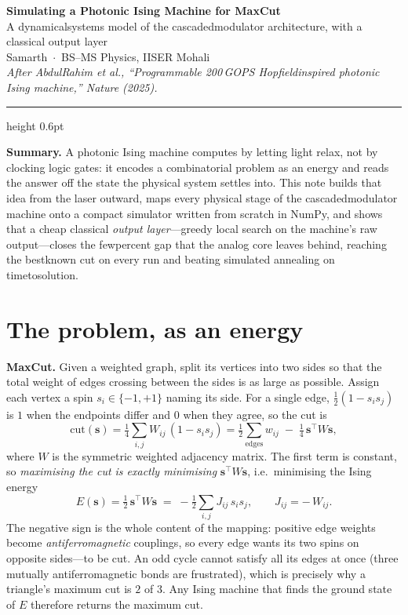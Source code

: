 \documentclass[11pt]{article}
\newcommand{\bs}{\mathbf{s}}
\begin{document}
\begin{center}
{\LARGE\bfseries\color{ink} Simulating a Photonic Ising Machine for Max\text{-}Cut}\\[0.35em]
{\large\color{accent} A dynamical\text{-}systems model of the cascaded\text{-}modulator architecture, with a classical output layer}\\[0.8em]
{\normalsize Samarth \,\textbf{$\cdot$}\, BS--MS Physics, IISER Mohali}\\[0.2em]
{\small\itshape After Abdul\text{-}Rahim \textit{et al.}, ``Programmable 200\,GOPS Hopfield\text{-}inspired photonic Ising machine,'' \textit{Nature} (2025).}
\end{center}

\vspace{0.4em}
\hrule height 0.6pt
\vspace{0.9em}

\noindent\textbf{Summary.}\; A photonic Ising machine computes by letting light relax, not by clocking logic gates: it encodes a combinatorial problem as an energy and reads the answer off the state the physical system settles into. This note builds that idea from the laser outward, maps every physical stage of the cascaded\text{-}modulator machine onto a compact simulator written from scratch in NumPy, and shows that a cheap classical \emph{output layer}---greedy local search on the machine's raw output---closes the few\text{-}percent gap that the analog core leaves behind, reaching the best\text{-}known cut on every run and beating simulated annealing on time\text{-}to\text{-}solution.

\section{The problem, as an energy}

\textbf{Max\text{-}Cut.} Given a weighted graph, split its vertices into two sides so that the total weight of edges crossing between the sides is as large as possible. Assign each vertex a spin $s_i\in\{-1,+1\}$ naming its side. For a single edge, $\tfrac{1}{2}(1-s_is_j)$ is $1$ when the endpoints differ and $0$ when they agree, so the cut is
\begin{equation}
\mathrm{cut}(\bs)=\tfrac14\sum_{i,j} W_{ij}\,(1-s_is_j)
=\tfrac12\!\sum_{\text{edges}}\! w_{ij}\;-\;\tfrac14\,\bs^{\!\top} W\bs,
\end{equation}
where $W$ is the symmetric weighted adjacency matrix. The first term is constant, so \emph{maximising the cut is exactly minimising} $\bs^{\!\top} W\bs$, i.e.\ minimising the Ising energy
\begin{equation}
E(\bs)=\tfrac12\,\bs^{\!\top} W\bs \;=\; -\tfrac12\sum_{i,j} J_{ij}\,s_is_j,\qquad J_{ij}=-\,W_{ij}.
\end{equation}
The negative sign is the whole content of the mapping: positive edge weights become \emph{antiferromagnetic} couplings, so every edge wants its two spins on opposite sides---to be cut. An odd cycle cannot satisfy all its edges at once (three mutually antiferromagnetic bonds are frustrated), which is precisely why a triangle's maximum cut is $2$ of $3$. Any Ising machine that finds the ground state of $E$ therefore returns the maximum cut.
\end{document}
